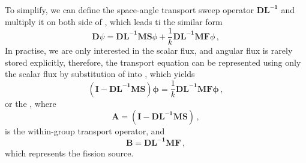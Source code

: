 To simplify, we can define the space-angle transport sweep operator $\mathbf{DL^{-1}}$ and multiply it on both side of , which leads ti the similar form 
\begin{equation}
  \mathbf{D} \psi =  \mathbf{DL^{-1}MS}\phi + \frac{1}{k} \mathbf{DL^{-1}MF} \phi  \, ,
 \label{eq:operatortrans}
\end{equation}
In practise, we are only interested in the scalar flux, and angular flux is rarely stored explicitly, therefore, the transport equation can be represented using only the scalar flux by substitution of  into , which yields
\begin{equation}
  \mathbf{(I - DL^{-1}MS)} \mathbf{\phi} = \frac{1}{k} \mathbf{DL^{-1}MF} \mathbf{\phi}  \, ,
 \label{eq:keig}
\end{equation}
or the , where
\begin{equation}
  \mathbf{A} = \mathbf{(I - DL^{-1}MS)}  \, ,
 \label{eq:AG}
\end{equation}
is the within-group transport operator, and 
\begin{equation}
  \mathbf{B} = \mathbf{DL^{-1}MF}  \, ,
 \label{eq:B}
\end{equation}
which represents the fission source.

